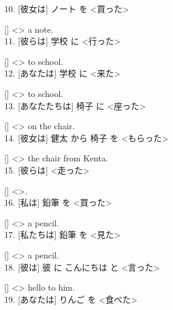 \documentclass[uplatex,
paper=a4,
fontsize=18pt,
jafontsize=16pt,
number_of_lines=30,
line_length=30zh,
baselineskip=25pt,
]{jlreq}
\begin{document}
10.  [彼女は] ノート を <買った>

  [\hspace{3em}] <\hspace{3em}> a note.
\\

11.  [彼らは] 学校 に <行った>

  [\hspace{3em}] <\hspace{3em}> to school.
\\

12.  [あなたは] 学校 に <来た>

  [\hspace{3em}] <\hspace{3em}> to school.
\\

13.  [あなたたちは] 椅子 に <座った>

  [\hspace{3em}] <\hspace{3em}> on the chair.
\\

14.  [彼女は] 健太 から 椅子 を <もらった>

  [\hspace{3em}] <\hspace{3em}> the chair from Kenta.
\\

15.  [彼らは] <走った>

  [\hspace{3em}] <\hspace{3em}>.
\\

16.  [私は] 鉛筆 を <買った>

  [\hspace{3em}] <\hspace{3em}> a pencil.
\\

17.  [私たちは] 鉛筆 を <見た>

  [\hspace{3em}] <\hspace{3em}> a pencil.
\\

18.  [彼は] 彼 に こんにちは と <言った>

  [\hspace{3em}] <\hspace{3em}> hello to him.
\\

19.  [あなたは] りんご を <食べた>
\end{document}
